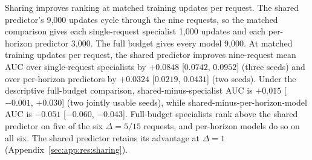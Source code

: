 \begin{revblock}
\nopagebreak
Sharing improves ranking at matched training updates per request. The shared predictor's 9,000 updates cycle through the nine requests, so the matched comparison gives each single-request specialist 1,000 updates and each per-horizon predictor 3,000. The full budget gives every model 9,000. At matched training updates per request, the shared predictor improves nine-request mean AUC over single-request specialists by $+0.0848$ [$0.0742$, $0.0952$] (three seeds) and over per-horizon predictors by $+0.0324$ [$0.0219$, $0.0431$] (two seeds). Under the descriptive full-budget comparison, shared-minus-specialist AUC is $+0.015$ [$-0.001$, $+0.030$] (two jointly usable seeds), while shared-minus-per-horizon-model AUC is $-0.051$ [$-0.060$, $-0.043$]. Full-budget specialists rank above the shared predictor on five of the six $\Delta=5/15$ requests, and per-horizon models do so on all six. The shared predictor retains its advantage at $\Delta=1$ (Appendix~\ref{sec:app:res:sharing}).
\end{revblock}

